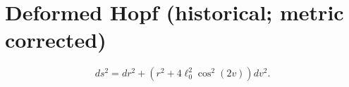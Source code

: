\documentclass[11pt]{article}
\begin{document}
\section*{Deformed Hopf (historical; metric corrected)}
\[
ds^2=dr^2+(r^2+4\ell_0^2\cos^2(2v))dv^2.
\]
\end{document}
